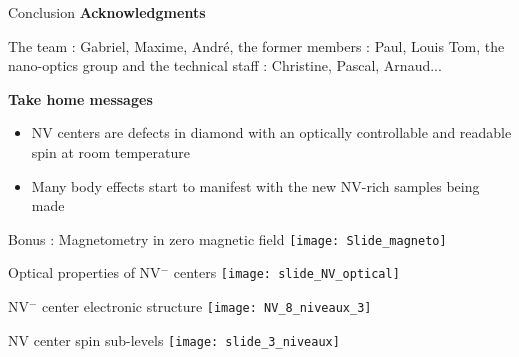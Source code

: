 \documentclass{beamer}
\begin{document}
\begin{frame}{Conclusion}
\textbf{Acknowledgments}  

The team : Gabriel, Maxime, André, the former members : Paul, Louis Tom, the nano-optics group and the technical staff : Christine, Pascal, Arnaud...

\bigskip
\textbf{Take home messages }
\begin{itemize}
\item NV centers are defects in diamond with an optically controllable and readable spin at room temperature
\medskip
\item Many body effects start to manifest with the new NV-rich samples being made
\end{itemize}
\end{frame}
\begin{frame}{Bonus : Magnetometry in zero magnetic field}
\centering
\texttt{[image: Slide\_magneto]}
\end{frame}
\begin{frame}{Optical properties of NV$^-$ centers}
\centering
\texttt{[image: slide\_NV\_optical]}
\end{frame}
\begin{frame}{NV$^-$ center electronic structure}
\centering
\texttt{[image: NV\_8\_niveaux\_3]}
\end{frame}
\begin{frame}{NV center spin sub-levels}
\centering
\texttt{[image: slide\_3\_niveaux]}
\end{frame}
\end{document}
